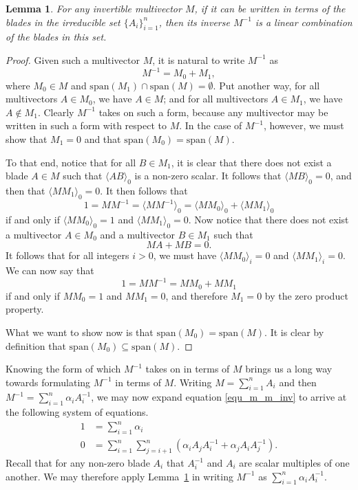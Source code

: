 \documentclass[12pt]{article}
\newtheorem{lemma}{Lemma}[section]
\begin{document}
\begin{lemma}\label{lem_inverse_form}
For any invertible multivector $M$, if it can be written in
terms of the blades in the irreducible set $\{A_i\}_{i=1}^n$, then its inverse $M^{-1}$ is a linear
combination of the blades in this set.
\end{lemma}
\begin{proof}
Given such a multivector $M$, it is natural to write $M^{-1}$ as
\begin{equation}
M^{-1} = M_0 + M_1,
\end{equation}
where $M_0\in M$ and $\mbox{span}(M_1)\cap\mbox{span}(M)=\emptyset$.
Put another way, for all multivectors $A\in M_0$, we have $A\in M$; and for
all multivectors $A\in M_1$, we have $A\not\in M_1$.
Clearly $M^{-1}$ takes on such
a form, because any multivector may be written in such a form with respect to $M$.
In the case of $M^{-1}$, however, we must show that $M_1=0$ and
that $\mbox{span}(M_0)=\mbox{span}(M)$.

To that end, notice that for all $B\in M_1$, it is clear that there
does not exist a blade $A\in M$ such that $\langle AB\rangle_0$ is a non-zero scalar.
It follows that $\langle MB\rangle_0=0$, and then that $\langle MM_1\rangle_0=0$.
It then follows that
\begin{equation}
1 = MM^{-1} = \langle MM^{-1}\rangle_0 = \langle MM_0\rangle_0 + \langle MM_1\rangle_0
\end{equation}
if and only if $\langle MM_0\rangle_0=1$ and $\langle MM_1\rangle_0=0$.
Now notice that there does not exist a multivector $A\in M_0$ and a multivector
$B\in M_1$ such that
\begin{equation}
MA+MB=0.
\end{equation}
It follows that for all integers $i>0$, we must have $\langle MM_0\rangle_i=0$
and $\langle MM_1\rangle_i=0$.  We can now say that
\begin{equation}
1 = MM^{-1} = MM_0 + MM_1
\end{equation}
if and only if $MM_0=1$ and $MM_1=0$, and therefore
$M_1=0$ by the zero product property.

What we want to show now is that $\mbox{span}(M_0)=\mbox{span}(M)$.
It is clear by definition that $\mbox{span}(M_0)\subseteq\mbox{span}(M)$.
\end{proof}

Knowing the form of which $M^{-1}$ takes on
in terms of $M$ brings us a long way towards formulating $M^{-1}$
in terms of $M$.  Writing $M=\sum_{i=1}^n A_i$ and then
$M^{-1}=\sum_{i=1}^n \alpha_i A_i^{-1}$, we may now expand
equation \eqref{equ_m_m_inv} to arrive at the following system of equations.
\begin{align}
1 &= \sum_{i=1}^n \alpha_i \\
0 &= \sum_{i=1}^n\sum_{j=i+1}^n\left(\alpha_iA_jA_i^{-1}+\alpha_jA_iA_j^{-1}\right).
\end{align}
Recall that for any non-zero blade $A_i$ that $A_i^{-1}$ and $A_i$ are scalar multiples
of one another.  We may therefore apply Lemma~\ref{lem_inverse_form} in writing $M^{-1}$
as $\sum_{i=1}^n \alpha_i A_i^{-1}$.

\end{document}
